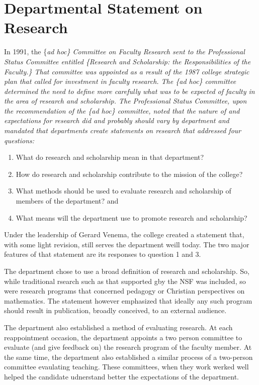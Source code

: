 \documentclass[
]{book}
\providecommand{\tightlist}{%
  \setlength{\itemsep}{0pt}\setlength{\parskip}{0pt}}
\begin{document}
\hypertarget{departmental-statement-on-research}{%
\section{Departmental Statement on Research}\label{departmental-statement-on-research}}

In 1991, the \{\em ad hoc\} Committee on Faculty Research sent to the Professional Status Committee entitled \{\em Research and Scholarship: the Responsibilities of the Faculty.\} That committee was appointed as a result of the 1987 college strategic plan that called for investment in faculty research. The \{\em ad hoc\} committee determined the need to define more carefully what was to be expected of faculty in the area of research and scholarship. The Professional Status Committee, upon the recommendation of the \{\em ad hoc\} committee, noted that the nature of and expectations for research did and probably should vary by department and mandated that departments create statements on research that addressed four questions:

\begin{enumerate}
\def\labelenumi{\arabic{enumi}.}
\tightlist
\item
  What do research and scholarship mean in that department?
\item
  How do research and scholarship contribute to the mission of
  the college?
\item
  What methods should be used to evaluate research
  and scholarship of members of the department? and
\item
  What means will the department use to promote research and scholarship?
\end{enumerate}

Under the leadership of Gerard Venema, the college created a statement that, with some light revision, still serves the department weill today. The two major features of that statement are its responses to question 1 and 3.

The department chose to use a broad definition of research and scholarship. So, while traditional rsearch such as that supported gby the NSF was included, so were research programs that concerned pedagogy or Christian perspectives on mathematics. The statement however emphasized that ideally any such program should result in publication, broadly conceived, to an external audience.

The department also established a method of evaluating research. At each reappointment occasion, the department appoints a two person committee to evaluate (and give feedback on) the research program of the faculty member. At the same time, the department also established a similar process of a two-person committee evaulating teaching. These committees, when they work werked well helped the candidate udnerstand better the expectations of the department.
\end{document}
